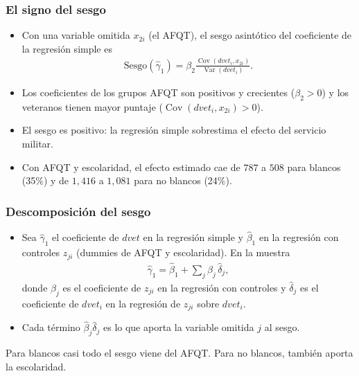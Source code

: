 \documentclass[t, compress, spanish, aspectratio=169]{beamer}
\DeclareMathOperator{\Var}{Var}
\DeclareMathOperator{\Cov}{Cov}
\begin{document}
	\begin{frame}
		\frametitle{El signo del sesgo}
		\small
		\begin{itemize}
			\item Con una variable omitida $x_{2i}$ (el AFQT), el sesgo asint\'otico del coeficiente de la regresi\'on simple es
			\begin{align*}
				\text{Sesgo}(\hat \gamma_1)=\beta_2\frac{\Cov(dvet_{i},x_{2i})}{\Var(dvet_{i})}.
			\end{align*}
			\item <2-> Los coeficientes de los grupos AFQT son positivos y crecientes ($\beta_2>0$) y los veteranos tienen mayor puntaje ($\Cov(dvet_i,x_{2i})>0$).
			\item <3-> \alert{El sesgo es positivo}: la regresi\'on simple sobrestima el efecto del servicio militar.
			\item <3-> Con AFQT y escolaridad, el efecto estimado cae de $787$ a $508$ para blancos (35\%) y de $1,416$ a $1,081$ para no blancos (24\%).
		\end{itemize}
	\end{frame}

	\begin{frame}
		\frametitle{Descomposici\'on del sesgo}
		\small
		\begin{itemize}
			\item Sea $\widehat \gamma_1$ el coeficiente de $dvet$ en la regresi\'on simple y $\widehat \beta_1$ en la regresi\'on con controles $z_{ji}$ (dummies de AFQT y escolaridad). En la muestra
			\begin{align*}
				\widehat \gamma_1 = \widehat \beta_1 + \sum_j \widehat \beta_j \, \widehat \delta_j,
			\end{align*}
			donde $\widehat \beta_j$ es el coeficiente de $z_{ji}$ en la regresi\'on con controles y $\widehat \delta_j$ es el coeficiente de $dvet_i$ en la regresi\'on de $z_{ji}$ sobre $dvet_i$.
			\item Cada t\'ermino $\widehat \beta_j \widehat \delta_j$ es lo que aporta la variable omitida $j$ al sesgo.
		\end{itemize}
		\begin{center}
			\scriptsize
			
		\end{center}
		\vspace{-0.2cm}
		\small
		Para blancos casi todo el sesgo viene del AFQT. Para no blancos, tambi\'en aporta la escolaridad.
	\end{frame}
\end{document}

